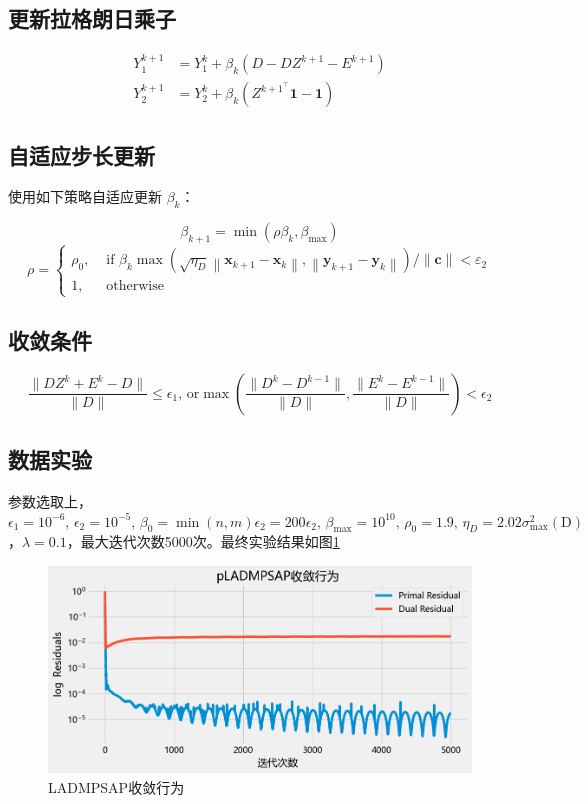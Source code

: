 \documentclass{homework}
\begin{document}
\begin{sol}
\subsection*{更新拉格朗日乘子}

\[
\begin{aligned}
Y_1^{k+1} &= Y_1^k + \beta_k (D - D Z^{k+1} - E^{k+1}) \\
Y_2^{k+1} &= Y_2^k + \beta_k (Z^{k+1^\top} \mathbf{1} - \mathbf{1})
\end{aligned}
\]

\subsection*{自适应步长更新}

使用如下策略自适应更新 \( \beta_k \)：

\[
\beta_{k+1} = \min(\rho \beta_k, \beta_{\max})
\]
$$
\rho= \begin{cases}\rho_0, & \text { if } \beta_k \max \left(\sqrt{\eta_D}\left\|\mathbf{x}_{k+1}-\mathbf{x}_k\right\|, \left\|\mathbf{y}_{k+1}-\mathbf{y}_k\right\|\right) /\|\mathbf{c}\|<\varepsilon_2 \\ 1, & \text { otherwise }\end{cases}
$$
\subsection*{收敛条件}
\[
\frac{\|DZ^k+E^k - D\|}{\|D\|}\le \epsilon_1,\, \text{or}
\max\left( \frac{\|D^k-D^{k-1}\|}{\|D\|}, \frac{\|E^k-E^{k-1}\|}{\|D\|} \right) < \epsilon_2
\]

\subsection*{数据实验}

参数选取上， \(\epsilon_1 = 10^{-6},\, \epsilon_2=10^{-5},\, \beta_0=\min(n,m)\epsilon_2 = 200\epsilon_2,\, \beta_{\max}=10^{10},\, \rho_0 = 1.9,\,\eta_D = 2.02\sigma^2_{\max}(\mathrm D) \)，$\lambda = 0.1$，最大迭代次数5000次。最终实验结果如图\ref{4}
\begin{figure}[h]
    \centering
        \centering
        \includegraphics[width=0.8\linewidth]{4.png}
        \caption{LADMPSAP收敛行为}\label{4}
\end{figure}
\end{sol}
\end{document}
